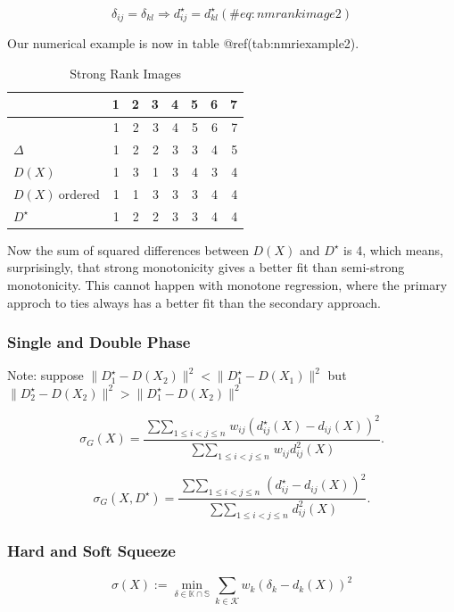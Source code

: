\documentclass[
  12pt,
  letterpaper,
  DIV=11,
  numbers=noendperiod]{scrreprt}
\theoremstyle{remark}
\begin{document}
\begin{equation}
\delta_{ij}=\delta_{kl}\Rightarrow d_{ij}^\star=d_{kl}^\star
(\#eq:nmrankimage2)
\end{equation}

Our numerical example is now in table @ref(tab:nmriexample2).

\begin{longtable}[]{@{}lrrrrrrr@{}}
\caption{Strong Rank Images}\tabularnewline
\toprule\noalign{}
& 1 & 2 & 3 & 4 & 5 & 6 & 7 \\
\midrule\noalign{}
\endfirsthead
\toprule\noalign{}
& 1 & 2 & 3 & 4 & 5 & 6 & 7 \\
\midrule\noalign{}
\endhead
\bottomrule\noalign{}
\endlastfoot
\(\Delta\) & 1 & 2 & 2 & 3 & 3 & 4 & 5 \\
\(D(X)\) & 1 & 3 & 1 & 3 & 4 & 3 & 4 \\
\(D(X)\ \text{ordered}\) & 1 & 1 & 3 & 3 & 3 & 4 & 4 \\
\(D^\star\) & 1 & 2 & 2 & 3 & 3 & 4 & 4 \\
\end{longtable}

Now the sum of squared differences between \(D(X)\) and \(D^\star\) is
4, which means, surprisingly, that strong monotonicity gives a better
fit than semi-strong monotonicity. This cannot happen with monotone
regression, where the primary approch to ties always has a better fit
than the secondary approach.

\subsubsection{Single and Double Phase}\label{single-and-double-phase}

Note: suppose \(\|D_1^\star-D(X_2)\|^2<\|D_1^\star-D(X_1)\|^2\) but
\(\|D_2^\star-D(X_2)\|^2>\|D_1^\star-D(X_2)\|^2\)

\[
\sigma_G(X)=\frac{\mathop{\sum\sum}_{1\leq i<j\leq n}w_{ij}(d^\star_{ij}(X)-d_{ij}(X))^2}{\mathop{\sum\sum}_{1\leq i<j\leq n}w_{ij}d_{ij}^2(X)}.
\]

\[
\sigma_G(X,D^\star)=\frac{\mathop{\sum\sum}_{1\leq i<j\leq n}(d^\star_{ij}-d_{ij}(X))^2}{\mathop{\sum\sum}_{1\leq i<j\leq n}d_{ij}^2(X)}.
\]

\subsubsection{Hard and Soft Squeeze}\label{hard-and-soft-squeeze}

\[
\sigma(X):=\min_{\delta\in\mathbb{K}\cap\mathbb{S}}\sum_{k\in\mathcal{K}}w_k(\delta_k-d_k(X))^2
\]
\end{document}
